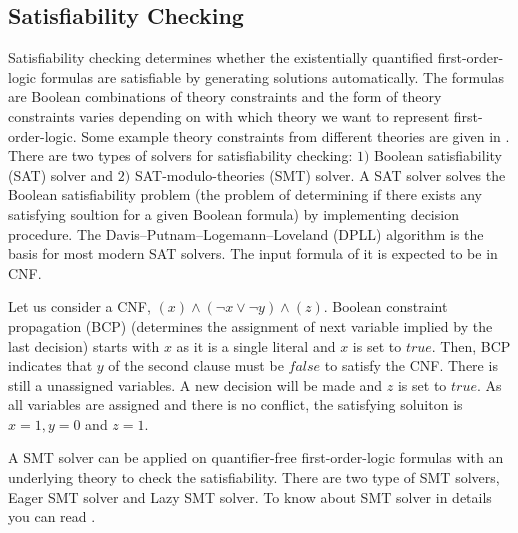 \subsection{Satisfiability Checking}
Satisfiability checking determines whether the existentially quantified first-order-logic formulas are satisfiable by generating solutions automatically. The formulas are Boolean combinations of theory constraints and the form of theory constraints varies depending on with which theory we want to represent first-order-logic. Some example theory constraints from different theories are given in \cite{erika}. There are two types of solvers for satisfiability checking: $1)$ Boolean satisfiability (SAT) solver and $2)$ SAT-modulo-theories (SMT) solver.\newline
A SAT solver solves the Boolean satisfiability problem (the problem of determining if there exists any satisfying soultion for a given Boolean formula) by implementing decision procedure. The Davis–Putnam–Logemann–Loveland (DPLL) algorithm is the basis for most modern SAT solvers. The input formula of it is expected to be in CNF.
\begin{example}
Let us consider a CNF, $(x) \wedge (\neg x\vee\neg y) \wedge (z)$. Boolean constraint propagation (BCP) (determines the assignment of next variable implied by the last decision) starts with $x$ as it is a single literal and $x$ is set to $true$. Then, BCP indicates that  $y$ of the second clause must be $false$ to satisfy the CNF. There is still a unassigned variables. A new decision will be made and $z$ is set to $true$. As all variables are assigned and there is no conflict, the satisfying soluiton is $x=1, y=0$ and $z=1$.
\end{example}
A SMT solver can be applied on quantifier-free first-order-logic formulas with an underlying theory to check the satisfiability. There are two type of SMT solvers, Eager SMT solver and Lazy SMT solver. To know about SMT solver in details you can read \cite{kremer}.
